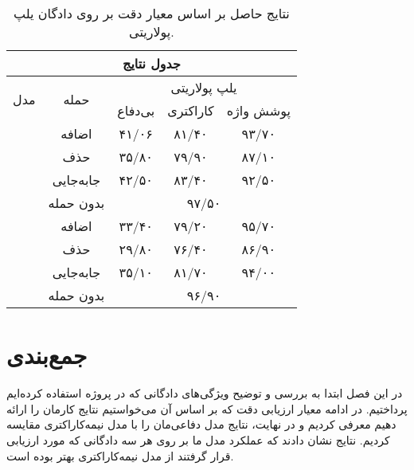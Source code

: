 \begin{table}[h]
	\centering
	\caption{نتایج حاصل بر اساس معیار دقت بر روی دادگان یلپ پولاریتی.}
	\label{yelptable}
	\begin{tabular}{ |c||c|c|c|c| }
		\hline
		\multicolumn{5}{|c|}{\textbf{جدول نتایج}} \\
		\hline
		\multirow{2}{*}{مدل} & \multirow{2}{*}{حمله} & \multicolumn{3}{|c|}{یلپ پولاریتی}\\\cline{3-5}
		
		&  & بی‌دفاع & ‌کاراکتری & پوشش واژه‌ \\
		\hline
		\multirow{3}{*}{\makecell{برت}}
		& اضافه & ۴۱/۰۶ & ‌۸۱/۴۰ & ۹۳/۷۰ \\
		& حذف  & ۳۵/۸۰ & ‌۷۹/۹۰ & ۸۷/۱۰ \\
		& جابه‌جایی  & ۴۲/۵۰ & ‌۸۳/۴۰ & ۹۲/۵۰\\\cline{3-5}
		& بدون حمله  & 
		\multicolumn{3}{|c|}{۹۷/۵۰}\\
		\hline
		\hline
		\multirow{3}{*}{\makecell{آلبرت}}
		& اضافه & ۳۳/۴۰ & ‌۷۹/۲۰ & ۹۵/۷۰ \\
		& حذف  & ۲۹/۸۰ & ‌۷۶/۴۰ & ۸۶/۹۰ \\
		& جابه‌جایی  & ۳۵/۱۰ & ‌۸۱/۷۰ & ۹۴/۰۰\\\cline{3-5}
		& بدون حمله  & 
		\multicolumn{3}{|c|}{۹۶/۹۰}\\
		\hline
		
	\end{tabular}
\end{table}


\section{جمع‌بندی}
در این فصل ابتدا به بررسی و توضیح ویژگی‌های دادگانی که در پروژه استفاده کرده‌ایم پرداختیم. در ادامه معیار ارزیابی‌ دقت که بر اساس آن می‌خواستیم نتایج کارمان را ارائه دهیم معرفی کردیم و در نهایت، نتایج مدل دفاعی‌مان را با مدل نیمه‌کاراکتری مقایسه کردیم. نتایج نشان دادند که عملکرد مدل ما بر روی هر سه دادگانی که مورد ارزیابی قرار گرفتند از مدل نیمه‌کاراکتری بهتر بوده است.


